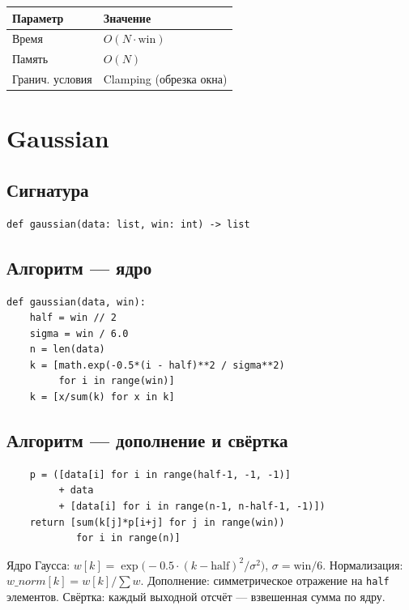 \documentclass[12pt,a4paper]{article}
\begin{document}
\begin{center}
\begin{tabular}{|l|l|}
\hline
\textbf{Параметр} & \textbf{Значение} \\
\hline
Время            & $O(N \cdot \text{win})$ \\
Память           & $O(N)$ \\
Гранич. условия  & Clamping (обрезка окна) \\
\hline
\end{tabular}
\end{center}

\section{Gaussian}

\subsection{Сигнатура}

\begin{lstlisting}
def gaussian(data: list, win: int) -> list
\end{lstlisting}

\subsection{Алгоритм --- ядро}

\begin{lstlisting}
def gaussian(data, win):
    half = win // 2
    sigma = win / 6.0
    n = len(data)
    k = [math.exp(-0.5*(i - half)**2 / sigma**2)
         for i in range(win)]
    k = [x/sum(k) for x in k]
\end{lstlisting}

\subsection{Алгоритм --- дополнение и свёртка}

\begin{lstlisting}
    p = ([data[i] for i in range(half-1, -1, -1)]
         + data
         + [data[i] for i in range(n-1, n-half-1, -1)])
    return [sum(k[j]*p[i+j] for j in range(win))
            for i in range(n)]
\end{lstlisting}

Ядро Гаусса: $w[k] = \exp\!\bigl(-0.5 \cdot (k - \text{half})^2 / \sigma^2\bigr)$, $\sigma = \text{win}/6$. Нормализация: $w\_norm[k] = w[k] / \sum w$. Дополнение: симметрическое отражение на \texttt{half} элементов. Свёртка: каждый выходной отсчёт --- взвешенная сумма по ядру.
\end{document}
